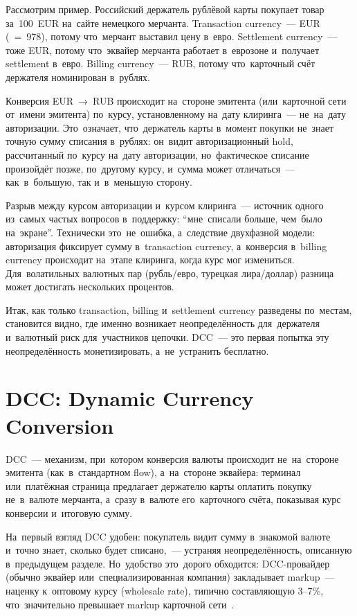 Рассмотрим пример. Российский держатель рублёвой карты
 покупает товар за~100~EUR на~сайте немецкого
мерчанта. Transaction currency~--- EUR (~=~978),
потому что~мерчант выставил цену в~евро. Settlement
currency~--- тоже EUR, потому что~эквайер мерчанта работает
в~еврозоне и~получает settlement в~евро. Billing currency~---
RUB, потому что~карточный счёт держателя номинирован в~рублях.

Конверсия EUR~→~RUB происходит на~стороне эмитента (или~карточной
сети от~имени эмитента) по~курсу, установленному 
на~дату клиринга~--- не~на~дату авторизации. Это~означает,
что~держатель карты в~момент покупки не~знает точную сумму
списания в~рублях: он~видит авторизационный hold,
рассчитанный по~курсу на~дату авторизации, но~фактическое
списание произойдёт позже, по~другому курсу, и~сумма может
отличаться~--- как~в~большую, так и~в~меньшую сторону.

\begin{important}
  Разрыв между курсом авторизации и~курсом клиринга~---
  источник одного из~самых частых вопросов в~поддержку:
  \enquote{мне~списали больше, чем~было на~экране}. Технически
  это~не~ошибка, а~следствие двухфазной модели: авторизация
  фиксирует сумму в~transaction currency, а~конверсия
  в~billing currency происходит на~этапе клиринга, когда
  курс мог измениться. Для~волатильных валютных пар
  (рубль/евро, турецкая лира/доллар) разница может
  достигать нескольких процентов.
\end{important}


Итак, как только transaction, billing и~settlement currency разведены
по~местам, становится видно, где именно возникает неопределённость
для~держателя и~валютный риск для~участников цепочки. DCC~---
это первая попытка эту неопределённость монетизировать,
а~не~устранить бесплатно.

\section{DCC: Dynamic Currency Conversion}
\label{sec:mc-dcc}

DCC~--- механизм, при~котором конверсия валюты происходит
не~на~стороне эмитента (как~в~стандартном flow), а~на~стороне
эквайера: терминал или~платёжная страница предлагает держателю
карты оплатить покупку не~в~валюте мерчанта, а~сразу в~валюте
его~карточного счёта, показывая курс конверсии и~итоговую
сумму.

На~первый взгляд DCC удобен: покупатель видит сумму в~знакомой
валюте и~точно знает, сколько будет списано,~--- устраняя
неопределённость, описанную в~предыдущем разделе. Но~удобство
это~дорого обходится: DCC-провайдер (обычно эквайер
или~специализированная компания) закладывает markup~--- наценку
к~оптовому курсу (wholesale rate), типично составляющую
3--7\%, что~значительно превышает markup карточной
сети~.

